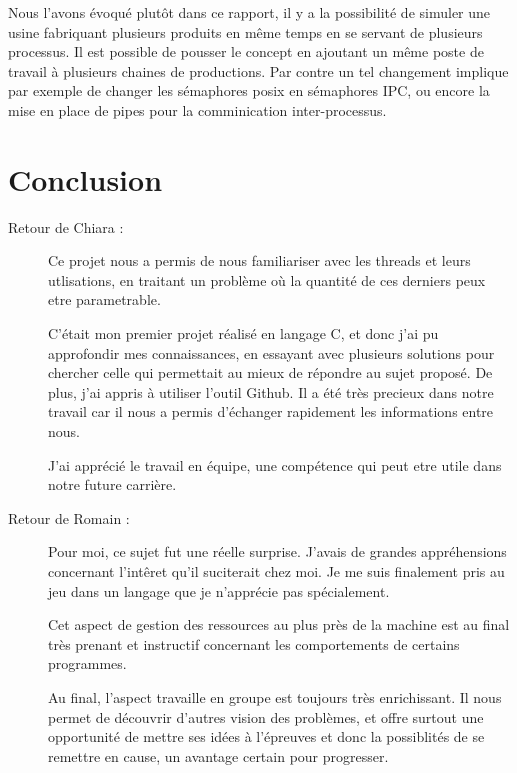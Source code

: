 \documentclass[11pt]{report}
\begin{document}
	Nous l'avons évoqué plutôt dans ce rapport, il y a la possibilité de simuler une usine fabriquant plusieurs produits en même temps en se servant de plusieurs processus. Il est possible de pousser le concept en ajoutant un même poste de travail à plusieurs chaines de productions. Par contre un tel changement implique par exemple de changer les sémaphores posix en sémaphores IPC, ou encore la mise en place de pipes pour la comminication inter-processus.
\chapter{Conclusion}
\begin{description}
\item[Retour de Chiara : ]Ce projet nous a permis de nous familiariser avec les threads et leurs utlisations, en traitant
un problème où la quantité de ces derniers peux etre parametrable.

C'était mon premier projet réalisé en langage C, et donc j'ai pu approfondir mes connaissances,
en essayant avec plusieurs solutions pour chercher celle qui permettait au mieux de répondre
au sujet proposé. De plus, j'ai appris à utiliser l'outil Github. Il a été très precieux dans notre
travail car il nous a permis d'échanger rapidement les informations entre nous.

J'ai apprécié le travail en équipe, une compétence qui peut etre utile dans notre future carrière.
\item[Retour de Romain : ]Pour moi, ce sujet fut une réelle surprise. J'avais de grandes appréhensions concernant l'intêret qu'il suciterait chez moi. Je me suis finalement pris au jeu dans un langage que je n'apprécie pas spécialement.

Cet aspect de gestion des ressources au plus près de la machine est au final très prenant et instructif concernant les comportements de certains programmes. 

Au final, l'aspect travaille en groupe est toujours très enrichissant. Il nous permet de découvrir d'autres vision des problèmes, et offre surtout une opportunité de mettre ses idées à l'épreuves et donc la possiblités de se remettre en cause, un avantage certain pour progresser.
\end{description}
\end{document}
